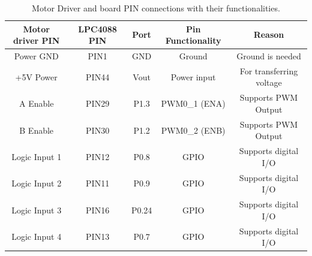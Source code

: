 \documentclass[12pt]{article}
\begin{document}
\begin {table}[H]
\begin{center}
\begin{tabular}{|c|c|c|c|c|}
\hline
Motor driver PIN & LPC4088 PIN & Port & Pin Functionality & Reason \\\hline
Power GND & PIN1 & GND & Ground & Ground is needed \\\hline
+5V Power & PIN44 & Vout & Power input & For transferring voltage \\\hline
A Enable & PIN29 & P1.3 & PWM0\_1 (ENA) & Supports PWM Output \\\hline
B Enable & PIN30 & P1.2 & PWM0\_2 (ENB) & Supports PWM Output \\\hline
Logic Input 1 & PIN12 & P0.8 & GPIO & Supports digital I/O \\\hline
Logic Input 2 & PIN11 & P0.9 & GPIO & Supports digital I/O \\\hline
Logic Input 3 & PIN16 & P0.24 & GPIO & Supports digital I/O \\\hline
Logic Input 4 & PIN13 & P0.7 & GPIO & Supports digital I/O \\\hline
\end{tabular}
\caption{Motor Driver and board PIN connections with their functionalities.}
\end{center}
\end{table}
\end{document}
